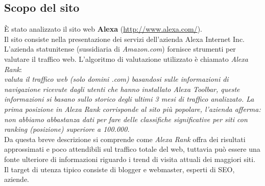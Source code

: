 \subsection{Scopo del sito}
È stato analizzato il sito web \textbf{Alexa} (\url{http://www.alexa.com/}). \\
Il sito consiste nella presentazione dei servizi dell'azienda Alexa Internet Inc. \\
L'azienda statunitense (sussidiaria di \textit{Amazon.com}) fornisce 
strumenti per valutare il traffico web. L'algoritmo di valutazione utilizzato è chiamato \textit{Alexa Rank}: \\
\textit{valuta il traffico web (solo domini .com) basandosi sulle informazioni di navigazione ricevute dagli utenti che 
hanno installato Alexa Toolbar, queste informazioni si basano sullo 
storico degli ultimi 3 mesi di traffico analizzato.
La prima posizione in Alexa Rank corrisponde al sito più popolare, 
l'azienda afferma: non abbiamo abbastanza dati per fare delle classifiche 
significative per siti con ranking (posizione) superiore a 100.000.} \\
Da questa breve descrizione si comprende come \textit{Alexa Rank} offra dei risultati approssimati e poco attendibili sul traffico totale del web, tuttavia può 
essere una fonte ulteriore di informazioni riguardo i trend di visita attuali dei maggiori siti.\\ 
Il target di utenza tipico consiste di blogger e webmaster, esperti di SEO, 
aziende.

